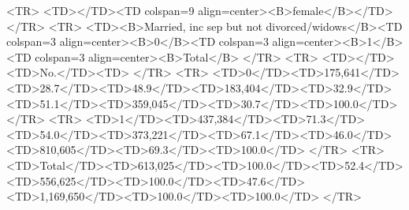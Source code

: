 <TR>
<TD></TD><TD colspan=9 align=center><B>female</B></TD>
</TR>
<TR>
<TD><B>Married, inc sep but not divorced/widows</B><TD colspan=3 align=center><B>0</B><TD colspan=3 align=center><B>1</B><TD colspan=3 align=center><B>Total</B>
</TR>
<TR>
<TD></TD><TD>No.</TD><TD>%
</TR>
<TR>
<TD>0</TD><TD>175,641</TD><TD>28.7</TD><TD>48.9</TD><TD>183,404</TD><TD>32.9</TD><TD>51.1</TD><TD>359,045</TD><TD>30.7</TD><TD>100.0</TD>
</TR>
<TR>
<TD>1</TD><TD>437,384</TD><TD>71.3</TD><TD>54.0</TD><TD>373,221</TD><TD>67.1</TD><TD>46.0</TD><TD>810,605</TD><TD>69.3</TD><TD>100.0</TD>
</TR>
<TR>
<TD>Total</TD><TD>613,025</TD><TD>100.0</TD><TD>52.4</TD><TD>556,625</TD><TD>100.0</TD><TD>47.6</TD><TD>1,169,650</TD><TD>100.0</TD><TD>100.0</TD>
</TR>
